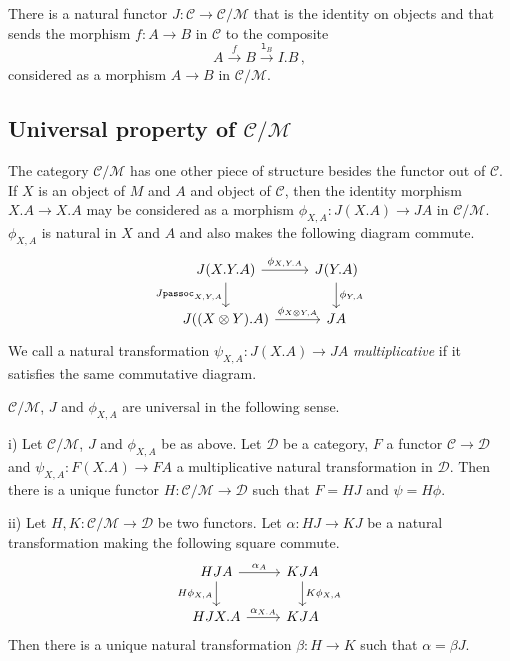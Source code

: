 \documentclass{svproc}
\newcommand\C{\mathcal{C}}
\newcommand\D{\mathcal{D}}
\newcommand\M{\mathcal{M}}
\newcommand{\passoc}{\texttt{passoc}}
\newcommand\tensor\otimes
\newcommand\lun{\texttt{l}}
\newcommand*\from{\colon}
\newcommand{\0}{{\mathtt{0}}} \newcommand{\com}{{\mathtt{com}}}
\begin{document}
There is a natural functor $J\from \C \to \C/\M$ that is the identity on objects and that sends the morphism $f\from A \to B$ in $\C$ to the composite
\[
  A \xrightarrow{f}
  B \xrightarrow{\lun_B}
  I.B\,,
  \]
considered as a morphism $A\to B$ in $\C/\M$.

\subsection{Universal property of $\C/\M$}

The category $\C/\M$ has one other piece of structure besides the functor out of $\C$.  
If $X$ is an object of $M$ and $A$ and object of $\C$, then the identity morphism $X.A\to X.A$ may be considered as a morphism $\phi_{X,A}\from J(X.A) \to JA$ in $\C/\M$.  
$\phi_{X,A}$ is natural in $X$ and $A$ and also makes the following diagram commute.
\[
  \begin{tikzcd}
    J(X.Y.A) \arrow[r, "\phi_{X,Y.A}"] \arrow[d, "J\passoc_{X,Y,A}"']
      & J(Y.A) \arrow[d, "\phi_{Y,A}"] \\
    J((X\tensor Y).A) \arrow[r, "\phi_{X\tensor Y,A}"]
      & JA
  \end{tikzcd}
  \]
We call a natural transformation $\psi_{X,A}\from J(X.A) \to JA$ \emph{multiplicative} if it satisfies the same commutative diagram.

$\C/\M$, $J$ and $\phi_{X,A}$ are universal in the following sense.

\begin{proposition}
  i) Let $\C/\M$, $J$ and $\phi_{X,A}$ be as above.  
  Let $\D$ be a category, $F$ a functor $\C\to \D$ and $\psi_{X,A}\from F(X.A) \to FA$ a multiplicative natural transformation in $\D$.  
  Then there is a unique functor $H\from \C/\M\to \D$ such that $F=H J$ and $\psi=H\phi$.

  ii) Let $H,K\from \C/\M\to \D$ be two functors.  
  Let $\alpha\from HJ \to KJ$ be a natural transformation making the following square commute.
  \[
    \begin{tikzcd}
      HJ A \arrow[r, "\alpha_A"] \arrow[d, "H\phi_{X,A}"']
        & KJ A \arrow[d, "K\phi_{X,A}"] \\
      HJ X.A \arrow[r, "\alpha_{X.A}"]
        & KJ A
    \end{tikzcd}
    \]
  Then there is a unique natural transformation $\beta\from H\to K$ such that $\alpha=\beta J$.
  \label{quotient-universal}
\end{proposition}
\end{document}
